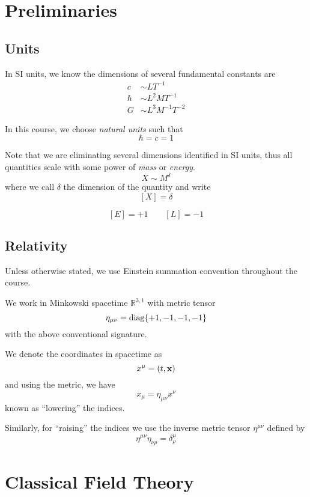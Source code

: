 \documentclass[a4paper,11pt]{article}
\begin{document}
	\newpage
	
	\tableofcontents
	\newpage
	\maintext
	\setcounter{section}{-1}
	\section{Preliminaries}
	\subsection{Units}
	In SI units, we know the dimensions of several fundamental constants are
	\begin{align*}
		c & \sim LT^{-1}\\
		\hbar & \sim L^2 M T^{-1}\\
		G & \sim L^3 M^{-1} T^{-2}
	\end{align*}

	In this course, we choose \emph{natural units} such that
	\[
		\hbar = c = 1
	\]
	
	Note that we are eliminating several dimensions identified in SI units, thus all quantities scale with some power of \emph{mass} or \emph{energy}.
	\[
		X \sim M^\delta
	\]
	where we call $\delta$ the dimension of the quantity and write
	\[
		[X] = \delta
	\]
	
	\begin{ex}
		\[
			[E] = +1 \qquad [L] = -1
		\]
	\end{ex}

	\subsection{Relativity}

	Unless otherwise stated, we use Einstein summation convention throughout the course.

	We work in Minkowski spacetime $\mathbb{R}^{3,1}$ with metric tensor
	\[
		\eta_{\mu\nu} = \operatorname{diag} \{+1, -1, -1, -1\}
	\]
	with the above conventional signature.

	We denote the coordinates in spacetime as 
	\[
		x^\mu = (t, \vb x)
	\]
	and using the metric, we have
	\[
		x_\mu = \eta_{\mu\nu} x^\nu
	\]
	known as ``lowering'' the indices. 
	
	Similarly, for ``raising'' the indices we use the inverse metric tensor $\eta^{\mu\nu}$ defined by
	\[
		\eta^{\mu\nu} \eta_{\nu\rho} = \delta^\mu_\rho
	\]
	\newpage
	\section{Classical Field Theory}
\end{document}
